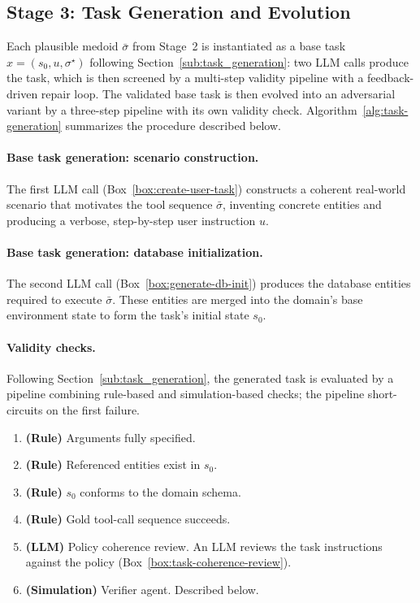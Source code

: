 \subsection{Stage 3: Task Generation and Evolution}
\label{app:task-generation}

Each plausible medoid $\bar{\sigma}$ from Stage~2 is instantiated as a base task $x=(s_0, u, \sigma^\star)$ following Section~\ref{sub:task_generation}: two LLM calls produce the task, which is then screened by a multi-step validity pipeline with a feedback-driven repair loop. The validated base task is then evolved into an adversarial variant by a three-step pipeline with its own validity check. Algorithm~\ref{alg:task-generation} summarizes the procedure described below.

\paragraph{Base task generation: scenario construction.}
The first LLM call (Box~\ref{box:create-user-task}) constructs a coherent real-world scenario that motivates the tool sequence $\bar{\sigma}$, inventing concrete entities and producing a verbose, step-by-step user instruction $u$.

\paragraph{Base task generation: database initialization.}
The second LLM call (Box~\ref{box:generate-db-init}) produces the database entities required to execute $\bar{\sigma}$. These entities are merged into the domain's base environment state to form the task's initial state $s_0$.

\paragraph{Validity checks.}
Following Section~\ref{sub:task_generation}, the generated task is evaluated by a pipeline combining rule-based and simulation-based checks; the pipeline short-circuits on the first failure.
\begin{enumerate}
  \item \textbf{(Rule)} Arguments fully specified.
  \item \textbf{(Rule)} Referenced entities exist in $s_0$.
  \item \textbf{(Rule)} $s_0$ conforms to the domain schema.
  \item \textbf{(Rule)} Gold tool-call sequence succeeds.
  \item \textbf{(LLM)} Policy coherence review. An LLM reviews the task instructions against the policy (Box~\ref{box:task-coherence-review}).
  \item \textbf{(Simulation)} Verifier agent. Described below.
\end{enumerate}

